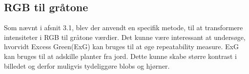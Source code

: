 \subsection{RGB til gråtone}
Som nævnt i afsnit 3.1, blev der anvendt en specifik metode, til at transformere intensiteter i RGB til gråtone værdier. Det kunne være interessant at undersøge, hvorvidt Excess Green(ExG) kan bruges til at øge repeatability measure. ExG kan bruges til at adskille planter fra jord\cite{exg}. Dette kunne skabe større kontrast i billedet og derfor muligvis tydeliggøre blobs og hjørner.